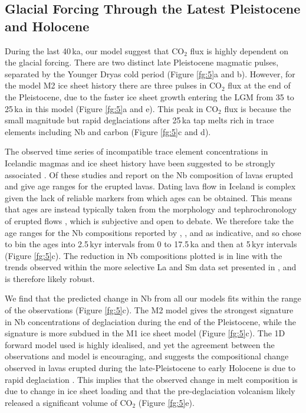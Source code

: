 \documentclass[draft,linenumbers]{agujournal2018}
\begin{document}
\subsection{Glacial Forcing Through the Latest Pleistocene and Holocene}

During the last 40\,ka, our model suggest that CO$_{2}$ flux is highly dependent on the glacial forcing. There are two distinct late Pleistocene magmatic pulses, separated by the Younger Dryas cold period (Figure \ref{fg:5}a and b). However, for the model M2 ice sheet history there are three pulses in CO$_{2}$ flux at the end of the Pleistocene, due to the faster ice sheet growth entering the LGM from 35 to 25\,ka in this model (Figure \ref{fg:5}a and e). This peak in CO$_{2}$ flux is because the small magnitude but rapid deglaciations after 25\,ka tap melts rich in trace elements including Nb and carbon (Figure \ref{fg:5}c and d).

The observed time series of incompatible trace element concentrations in Icelandic magmas and ice sheet history have been suggested to be strongly associated \citep{jull-1996,gee-etal-1998,maclennan-etal-2002,sinton-etal-2005,eason-etal-2015}. Of these studies \cite{gee-etal-1998} and \cite{eason-etal-2015} report on the Nb composition of lavas erupted and give age ranges for the erupted lavas. Dating lava flow in Iceland is complex given the lack of reliable markers from which ages can be obtained. This means that ages are instead typically taken from the morphology and tephrochronology of erupted flows \citep{maclennan-etal-2002}, which is subjective and open to debate. We therefore take the age ranges for the Nb compositions reported by \cite{gee-etal-1998}, \cite{sinton-etal-2005}, and \cite{eason-etal-2015} as indicative, and so chose to bin the ages into 2.5\,kyr intervals from 0 to 17.5\,ka and then at 5\,kyr intervals (Figure \ref{fg:5}c). The reduction in Nb compositions plotted is in line with the trends observed within the more selective La and Sm data set presented in \cite{maclennan-etal-2002}, and is therefore likely robust.

We find that the predicted change in Nb from all our models fits within the range of the observations (Figure \ref{fg:5}c). The M2 model gives the strongest signature in Nb concentrations of deglaciation during the end of the Pleistocene, while the signature is more subdued in the M1 ice sheet model (Figure \ref{fg:5}c). The 1D forward model used is highly idealised, and yet the agreement between the observations and model is encouraging, and suggests the compositional change observed in lavas erupted during the late-Pleistocene to early Holocene is due to rapid deglaciation \citep{maclennan-etal-2002,sinton-etal-2005,gee-etal-1998,eason-etal-2015}. This implies that the observed change in melt composition is due to change in ice sheet loading and that the pre-deglaciation volcanism likely released a significant volume of CO$_{2}$ (Figure \ref{fg:5}e).
\end{document}
